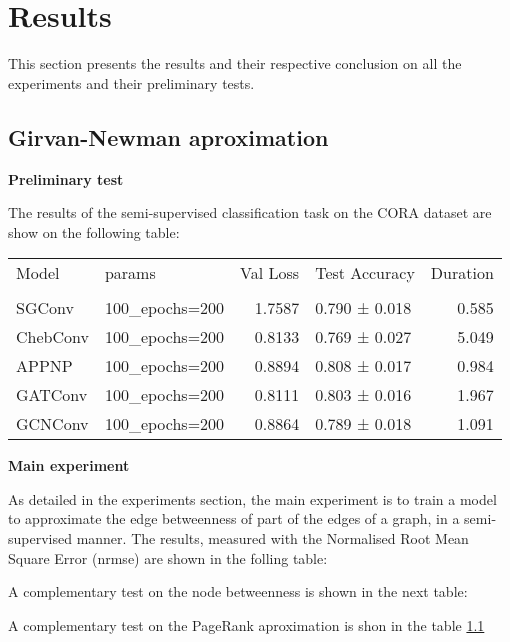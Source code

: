 \newpage
\section{Results}

This section presents the results and their respective conclusion on all the experiments and their preliminary tests.

\subsection{Girvan-Newman aproximation}


\textbf{Preliminary test}

The results of the semi-supervised classification task on the CORA dataset are show on the following table:



\begin{tabular}{llrlr}
\toprule
    Model &           params &   Val Loss &   Test Accuracy &   Duration \\\\
\midrule
   SGConv &   100\_epochs=200 &     1.7587 &   0.790 ± 0.018 &      0.585 \\
 ChebConv &   100\_epochs=200 &     0.8133 &   0.769 ± 0.027 &      5.049 \\
    APPNP &   100\_epochs=200 &     0.8894 &   0.808 ± 0.017 &      0.984 \\
  GATConv &   100\_epochs=200 &     0.8111 &   0.803 ± 0.016 &      1.967 \\
  GCNConv &   100\_epochs=200 &     0.8864 &   0.789 ± 0.018 &      1.091 \\
\bottomrule

\end{tabular}




\textbf{Main experiment}

As detailed in the experiments section, the main experiment is to train a model to approximate the edge betweenness of part of the edges of a graph, in a semi-supervised manner. The results, measured with the Normalised Root Mean Square Error (nrmse) are shown in the folling table:



A complementary test on the node betweenness is shown in the next table:



A complementary test on the PageRank aproximation is shon in the table \ref{}



